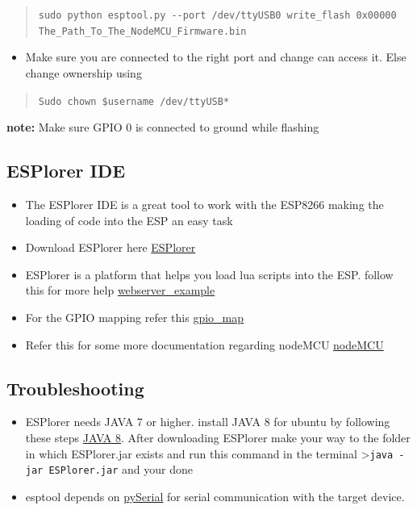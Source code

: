 \documentclass[16pt]{article}
\begin{document}
\begin{quote}
\texttt{sudo python esptool.py -{}-port /dev/ttyUSB0  write\_flash 0x00000 The\_Path\_To\_The\_NodeMCU\_Firmware.bin}
\end{quote}

\begin{itemize}

\item
  Make sure you are connected to the right port and change can access
  it. Else change ownership using
\end{itemize}

\begin{quote}
\texttt{Sudo chown \$username /dev/ttyUSB*}
\end{quote}

\textbf{note:} Make sure GPIO 0 is connected to ground while flashing
\vspace{0.5cm}

\subsection{ESPlorer IDE}

\begin{itemize}

\item
  The ESPlorer IDE is a great tool to work with the ESP8266 making the
  loading of code into the ESP an easy task
\item
  Download ESPlorer here
 \href{http://esp8266.ru/esplorer/\#download}{ESPlorer}
\item
  ESPlorer is a platform that helps you load lua scripts into the ESP.
  follow this for more help
  \href{http://randomnerdtutorials.com/esp8266-web-server/}{webserver\_example}
\item
  For the GPIO mapping refer this
  \href{https://github.com/nodemcu/nodemcu-firmware}{gpio\_map}
\item
  Refer this for some more documentation regarding nodeMCU
  \href{http://www.nodemcu.com/docs/}{nodeMCU}
\end{itemize}

\subsection{Troubleshooting}

\begin{itemize}

\item
  ESPlorer needs JAVA 7 or higher. install JAVA 8 for ubuntu by
  following these steps
  \href{http://tecadmin.net/install-oracle-java-8-jdk-8-ubuntu-via-ppa/}{JAVA 8}.
  After downloading ESPlorer make your way to the folder in which
  ESPlorer.jar exists and run this command in the terminal
  \textgreater{}\texttt{java -jar ESPlorer.jar} and your done
\item
  esptool depends on \href{http://pyserial.sourceforge.net/}{pySerial}
  for serial communication with the target device.
\end{itemize}
\end{document}
